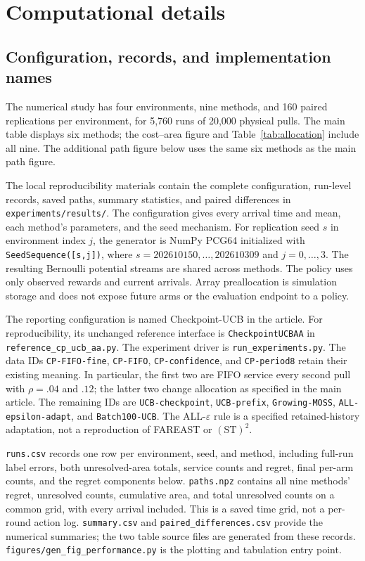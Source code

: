 \section{Computational details}
\label{app:computation}

\subsection{Configuration, records, and implementation names}

The numerical study has four environments, nine methods, and 160 paired
replications per environment, for 5,760 runs of 20,000 physical pulls.
The main table displays six methods; the cost--area figure and
Table~\ref{tab:allocation} include all nine. The additional path figure
below uses the same six methods as the main path figure.

The local reproducibility materials contain the complete configuration,
run-level records, saved paths, summary statistics, and paired differences
in \texttt{experiments/results/}. The configuration gives every arrival
time and mean, each method's parameters, and the seed mechanism. For
replication seed $s$ in environment index $j$, the generator is NumPy
PCG64 initialized with \texttt{SeedSequence([s,j])}, where
$s=202610150,\ldots,202610309$ and $j=0,\ldots,3$.
The resulting Bernoulli potential streams are shared across methods.
The policy uses only observed rewards and current arrivals. Array
preallocation is simulation storage and does not expose future arms or
the evaluation endpoint to a policy.

The reporting configuration is named Checkpoint-UCB in the article.
For reproducibility, its unchanged reference interface is
\texttt{CheckpointUCBAA} in \texttt{reference\_cp\_ucb\_aa.py}.
The experiment driver is \texttt{run\_experiments.py}.
The data IDs \texttt{CP-FIFO-fine}, \texttt{CP-FIFO},
\texttt{CP-confidence}, and \texttt{CP-period8} retain their existing
meaning. In particular, the first two are FIFO service every second pull
with $\rho=.04$ and $.12$; the latter two change allocation as specified
in the main article. The remaining IDs are \texttt{UCB-checkpoint},
\texttt{UCB-prefix}, \texttt{Growing-MOSS},
\texttt{ALL-epsilon-adapt}, and \texttt{Batch100-UCB}.
The ALL-$\varepsilon$ rule is a specified retained-history adaptation,
not a reproduction of FAREAST or $(\mathrm{ST})^2$.

\texttt{runs.csv} records one row per environment, seed, and method,
including full-run label errors, both unresolved-area totals, service
counts and regret, final per-arm counts, and the regret components below.
\texttt{paths.npz} contains all nine methods' regret, unresolved counts,
cumulative area, and total unresolved counts on a common grid, with
every arrival included. This is a saved time grid, not a per-round action
log. \texttt{summary.csv} and \texttt{paired\_differences.csv} provide
the numerical summaries; the two table source files are generated from
these records. \texttt{figures/gen\_fig\_performance.py} is the plotting
and tabulation entry point.

